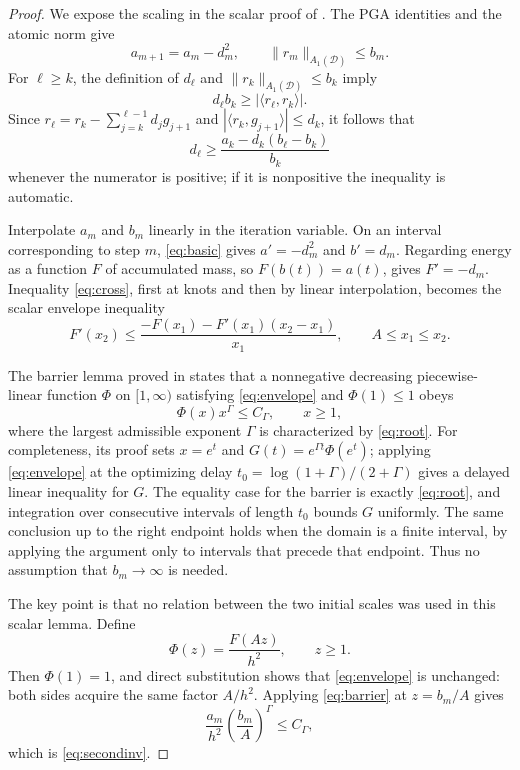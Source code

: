 \documentclass[11pt]{article}
\newcommand{\Aone}{A_1(\mathcal D)}
\begin{document}
\begin{proof}
We expose the scaling in the scalar proof of \cite{Silnichenko2004}.  The PGA
identities and the atomic norm give
\begin{equation}\label{eq:basic}
 a_{m+1}=a_m-d_m^2,\qquad
 \|r_m\|_{\Aone}\leq b_m.
\end{equation}
For $\ell\geq k$, the definition of $d_\ell$ and
$\|r_k\|_{\Aone}\leq b_k$ imply
\[
 d_\ell b_k\geq |\langle r_\ell,r_k\rangle|.
\]
Since $r_\ell=r_k-\sum_{j=k}^{\ell-1}d_jg_{j+1}$ and
$|\langle r_k,g_{j+1}\rangle|\leq d_k$, it follows that
\begin{equation}\label{eq:cross}
 d_\ell\geq
 \frac{a_k-d_k(b_\ell-b_k)}{b_k}
\end{equation}
whenever the numerator is positive; if it is nonpositive the inequality is
automatic.

Interpolate $a_m$ and $b_m$ linearly in the iteration variable.  On an
interval corresponding to step $m$, \eqref{eq:basic} gives
$a'=-d_m^2$ and $b'=d_m$.  Regarding energy as a function $F$ of accumulated
mass, so $F(b(t))=a(t)$, gives $F'=-d_m$.  Inequality
\eqref{eq:cross}, first at knots and then by linear interpolation, becomes
the scalar envelope inequality
\begin{equation}\label{eq:envelope}
 F'(x_2)\leq
 \frac{-F(x_1)-F'(x_1)(x_2-x_1)}{x_1},\qquad A\leq x_1\leq x_2.
\end{equation}

The barrier lemma proved in \cite{Silnichenko2004} states that a nonnegative
decreasing piecewise-linear function $\Phi$ on $[1,\infty)$ satisfying
\eqref{eq:envelope} and $\Phi(1)\leq1$ obeys
\begin{equation}\label{eq:barrier}
 \Phi(x)x^\Gamma\leq C_\Gamma,\qquad x\geq1,
\end{equation}
where the largest admissible exponent $\Gamma$ is characterized by
\eqref{eq:root}.  For completeness, its proof sets
$x=e^t$ and $G(t)=e^{\Gamma t}\Phi(e^t)$; applying
\eqref{eq:envelope} at the optimizing delay
$t_0=\log(1+\Gamma)/(2+\Gamma)$ gives a delayed linear inequality for $G$.
The equality case for the barrier is exactly \eqref{eq:root}, and integration
over consecutive intervals of length $t_0$ bounds $G$ uniformly.
The same conclusion up to the right endpoint holds when the domain is a
finite interval, by applying the argument only to intervals that precede
that endpoint.  Thus no assumption that $b_m\to\infty$ is needed.

The key point is that no relation between the two initial scales was used in
this scalar lemma.  Define
\[
 \Phi(z)=\frac{F(Az)}{h^2},\qquad z\geq1.
\]
Then $\Phi(1)=1$, and direct substitution shows that \eqref{eq:envelope} is
unchanged: both sides acquire the same factor $A/h^2$.  Applying
\eqref{eq:barrier} at $z=b_m/A$ gives
\[
 \frac{a_m}{h^2}\left(\frac{b_m}{A}\right)^\Gamma
 \leq C_\Gamma,
\]
which is \eqref{eq:secondinv}.
\end{proof}
\end{document}
